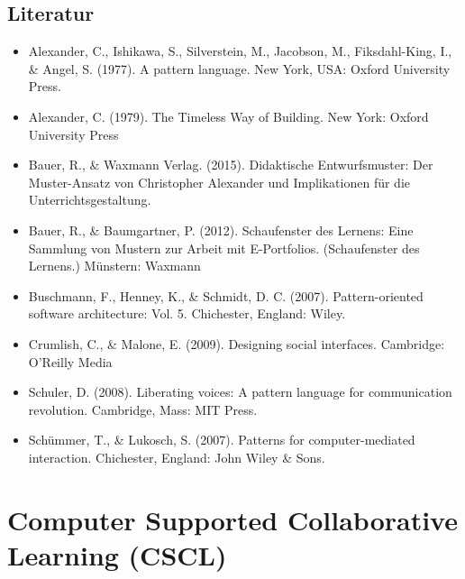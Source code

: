 \section*{Literatur\label{/mi-2017/modulbeschreibungen-master/MA_SC_Soziotechnische_Entwurfsmuster}}\label{literaturpathlabelmi-2017modulbeschreibungen-mastermaux5fscux5fsoziotechnischeux5fentwurfsmuster}

\begin{itemize}
\tightlist
\item
  Alexander, C., Ishikawa, S., Silverstein, M., Jacobson, M.,
  Fiksdahl-King, I., \& Angel, S. (1977). A pattern language. New York,
  USA: Oxford University Press.
\item
  Alexander, C. (1979). The Timeless Way of Building. New York: Oxford
  University Press
\item
  Bauer, R., \& Waxmann Verlag. (2015). Didaktische Entwurfsmuster: Der
  Muster-Ansatz von Christopher Alexander und Implikationen für die
  Unterrichtsgestaltung.
\item
  Bauer, R., \& Baumgartner, P. (2012). Schaufenster des Lernens: Eine
  Sammlung von Mustern zur Arbeit mit E-Portfolios. (Schaufenster des
  Lernens.) Münstern: Waxmann
\item
  Buschmann, F., Henney, K., \& Schmidt, D. C. (2007). Pattern-oriented
  software architecture: Vol. 5. Chichester, England: Wiley.
\item
  Crumlish, C., \& Malone, E. (2009). Designing social interfaces.
  Cambridge: O'Reilly Media
\item
  Schuler, D. (2008). Liberating voices: A pattern language for
  communication revolution. Cambridge, Mass: MIT Press.
\item
  Schümmer, T., \& Lukosch, S. (2007). Patterns for computer-mediated
  interaction. Chichester, England: John Wiley \& Sons.
\end{itemize}

\chapter{Computer Supported Collaborative Learning
(CSCL)\label{/mi-2017/modulbeschreibungen-master/MA_SC_WPF_CSCL}}\label{computer-supported-collaborative-learning-csclpathlabelmi-2017modulbeschreibungen-mastermaux5fscux5fwpfux5fcscl}

